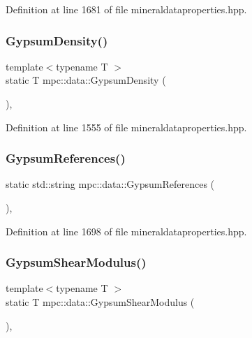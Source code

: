 Definition at line 1681 of file mineraldataproperties.\+hpp.

\mbox{\label{namespacempc_1_1data_afaf12e86464e4999665aa920c8fe2ed2}} 
\subsubsection{\texorpdfstring{Gypsum\+Density()}{GypsumDensity()}}
{\footnotesize\ttfamily template$<$typename T $>$ \\
static T mpc\+::data\+::\+Gypsum\+Density (\begin{DoxyParamCaption}{ }\end{DoxyParamCaption})\hspace{0.3cm}{\ttfamily [inline]}, {\ttfamily [static]}}



Definition at line 1555 of file mineraldataproperties.\+hpp.

\mbox{\label{namespacempc_1_1data_aaabd788c6e1ba85f61073820a781d728}} 
\subsubsection{\texorpdfstring{Gypsum\+References()}{GypsumReferences()}}
{\footnotesize\ttfamily static std\+::string mpc\+::data\+::\+Gypsum\+References (\begin{DoxyParamCaption}{ }\end{DoxyParamCaption})\hspace{0.3cm}{\ttfamily [inline]}, {\ttfamily [static]}}



Definition at line 1698 of file mineraldataproperties.\+hpp.

\mbox{\label{namespacempc_1_1data_a41cf4ad737e4f3d91615f4d821581cde}} 
\subsubsection{\texorpdfstring{Gypsum\+Shear\+Modulus()}{GypsumShearModulus()}}
{\footnotesize\ttfamily template$<$typename T $>$ \\
static T mpc\+::data\+::\+Gypsum\+Shear\+Modulus (\begin{DoxyParamCaption}{ }\end{DoxyParamCaption})\hspace{0.3cm}{\ttfamily [inline]}, {\ttfamily [static]}}



